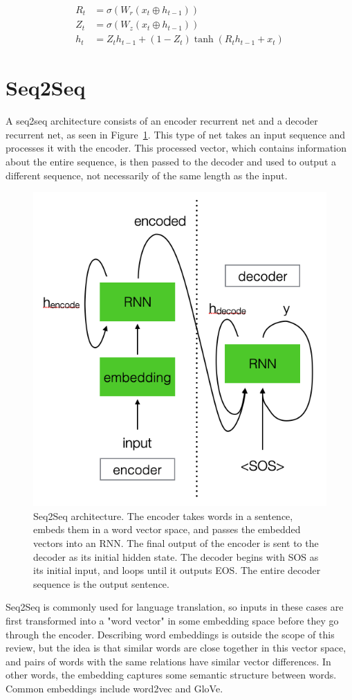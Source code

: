 \begin{align}
    R_t &= \sigma(W_r (x_t \oplus h_{t-1})) \\
    Z_t &= \sigma(W_z (x_t \oplus h_{t-1})) \\
    h_t &= Z_t h_{t-1} + (1-Z_t)\tanh(R_t h_{t-1} + x_t)
\end{align}

\section{Seq2Seq}

A seq2seq architecture consists of an encoder recurrent net and a decoder recurrent net, as seen in Figure~\ref{fig:seq2seq}. This type of net takes an input sequence and processes it with the encoder. This processed vector, which contains information about the entire sequence, is then passed to the decoder and used to output a different sequence, not necessarily of the same length as the input.

\begin{figure}[htbp]
    \centering
    \includegraphics[width=0.55\linewidth]{Images/ML/seq2seq.png}
    \caption{Seq2Seq architecture. The encoder takes words in a sentence, embeds them in a word vector space, and passes the embedded vectors into an RNN. The final output of the encoder is sent to the decoder as its initial hidden state. The decoder begins with SOS as its initial input, and loops until it outputs EOS. The entire decoder sequence is the output sentence.}
    \label{fig:seq2seq}
\end{figure}

Seq2Seq is commonly used for language translation, so inputs in these cases are first transformed into a "word vector" in some embedding space before they go through the encoder. Describing word embeddings is outside the scope of this review, but the idea is that similar words are close together in this vector space, and pairs of words with the same relations have similar vector differences. In other words, the embedding captures some semantic structure between words. Common embeddings include word2vec and GloVe.

